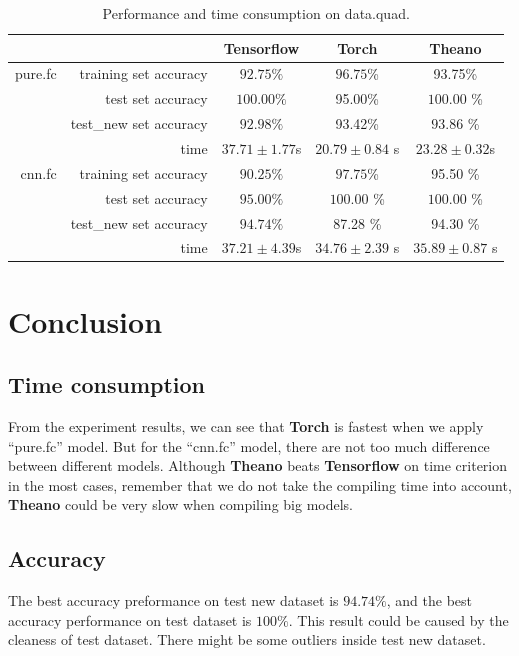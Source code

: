 \documentclass[a4paper]{article}
\begin{document}
\begin{table}[H]
\centering
\begin{tabular}{|r|r|c|c|c|}
\hline
 & & Tensorflow & Torch & Theano \\
\hline
pure.fc & training set accuracy & $92.75\%$ & $\bm{96.75}$\% & 93.75\% \\
 & test set accuracy & $\bm{100.00}\%$ & 95.00\% & $\bm{100.00}$ \% \\
 & test\_new set accuracy & $92.98\%$ & 93.42\% & $\bm{93.86}$ \% \\
 & time & $37.71\pm1.77$s & $\bm{20.79 \pm 0.84}$ s & $23.28 \pm 0.32$s\\
\hline
cnn.fc & training set accuracy & $90.25\%$ & $\bm{97.75}$\% & 95.50 \% \\
 & test set accuracy & $95.00\%$ & $\bm{100.00}$ \% & $\bm{100.00}$ \% \\
 & test\_new set accuracy & $\bm{94.74}\%$ & 87.28 \% & 94.30 \% \\
 & time & $37.21\pm4.39$s & $\bm{34.76 \pm 2.39}$ s & $ 35.89 \pm 0.87$ s\\
\hline
\end{tabular}
\caption{Performance and time consumption on data.quad.}
\end{table}

\section{Conclusion}
\label{conclusion}

\subsection{Time consumption}

From the experiment results, we can see that \textbf{Torch} is fastest when we apply ``pure.fc'' model. But for the ``cnn.fc'' model, there are not too much difference between different models. Although {\bf Theano} beats {\bf Tensorflow} on time criterion in the most cases, remember that we do not take the compiling time into account, {\bf Theano} could be very slow when compiling big models.

\subsection{Accuracy}

The best accuracy preformance on test new dataset is $94.74\%$, and the best accuracy performance on test dataset is $100\%$. This result could be caused by the cleaness of test dataset. There might be some outliers inside test new dataset.
\end{document}
